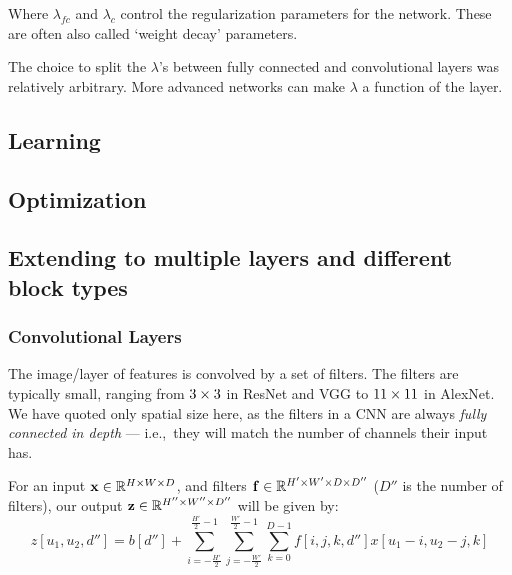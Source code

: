  Where $\lambda_{fc}$ and $\lambda_{c}$ control the regularization parameters
  for the network. These are often also called `weight decay' parameters.

  The choice to split the $\lambda$'s between fully connected and convolutional
  layers was relatively arbitrary. More advanced networks can make $\lambda$
  a function of the layer. 


\subsection{Learning}

\subsection{Optimization}

\subsection{Extending to multiple layers and different block types}

\begin{figure}
  \centering
  
\end{figure}
\subsubsection{Convolutional Layers}
  The image/layer of features is convolved by a set of filters.
  The filters are typically small, ranging from $3\times 3$ in ResNet and VGG
  to $11\times 11$ in AlexNet. We have quoted only spatial size
  here, as the filters in a CNN are always \emph{fully connected in depth} ---
  i.e.,\ they will match the number of channels their input has.

  For an input $\mathbf{x} \in \mathbb{R}^{H\times W\times D}$, and filters 
  $\mathbf{f} \in \mathbb{R}^{H'\times W'  \times D \times D''}$ ($D''$ is the 
  number of filters), our output $\mathbf{z} \in
  \mathbb{R}^{H''\times W'' \times D''}$ will be given by:
  \begin{equation}
    z[u_1, u_2, d''] = b[d''] + \sum_{i=-\frac{H'}{2}}^{\frac{H'}{2}-1}
                       \sum_{j=-\frac{W'}{2}}^{\frac{W'}{2}-1}  \sum_{k=0}^{D-1}  
                        f[i, j, k, d''] x[u_1-i, u_2-j, k]
  \end{equation}


